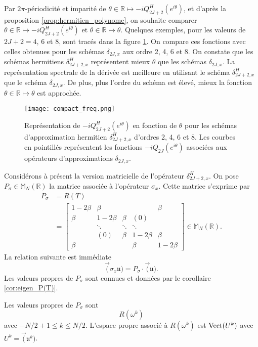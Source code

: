 Par $2 \pi$-périodicité et imparité de $\theta \in \mathbb{R} \mapsto - i Q_{2J+2}^H(e^{i \theta})$, et d'après la proposition \ref{prop:hermitien_polynome}, on souhaite comparer $\theta \in \mathbb{R} \mapsto - i Q_{2J+2}^H(e^{i \theta})$ et $\theta \in \mathbb{R} \mapsto \theta$. Quelques exemples, pour les valeurs de $2J+2 = 4$, $6$ et $8$, sont tracés dans la figure \ref{fig:freq_herm}. On compare ces fonctions avec celles obtenues pour les schémas $\delta_{2J,x}$ aux ordre 2, 4, 6 et 8. On constate que les schémas hermitiens $\delta_{2J+2,x}^H$ représentent mieux $\theta$ que les schémas $\delta_{2J,x}$. La représentation spectrale de la dérivée est meilleure en utilisant le schéma $\delta_{2J+2,x}^H$ que le schéma $\delta_{2J,x}$. De plus, plus l'ordre du schéma est élevé, mieux la fonction $\theta \in \mathbb{R} \mapsto \theta$ est approchée.

\begin{figure}[htbp]
\begin{center}
\texttt{[image: compact\_freq.png]}
\end{center}
\caption{Représentation de $-i Q_{2J+2}^H \left( e^{i \theta} \right)$ en fonction de $\theta$ pour les schémas d'approximation hermitien $\delta_{2J+2,x}^H$ d'ordres 2, 4, 6 et 8. Les courbes en pointillés représentent les fonctions $-i Q_{2J}\left( e^{i \theta} \right)$ associées aux opérateurs d'approximations $\delta_{2J,x}$.}
\label{fig:freq_herm}
\end{figure}


Considérons à présent la version matricielle de l'opérateur $\delta_{2J+2,x}^H$. On pose $P_{\sigma} \in \mathbb{M}_N(\mathbb{R})$ la matrice associée à l'opérateur $\sigma_x$. Cette matrice s'exprime par
\begin{align}
P_{\sigma} & = R(T) \\
  & = \begin{bmatrix}
  1 - 2 \beta & \beta &   &   & \beta \\ 
  \beta & 1 - 2 \beta & \beta & (0) &   \\ 
    & \ddots & \ddots & \ddots &   \\ 
    & (0) & \beta & 1 - 2 \beta & \beta \\ 
  \beta &   &   & \beta & 1 - 2 \beta
  \end{bmatrix} \in \mathbb{M}_{N}(\mathbb{R}).
\label{eq:matrice_implicitpart}
\end{align}
La relation suivante est immédiate
\begin{equation}
\vec (\sigma_x \mathfrak{u}) = P_{\sigma} \cdot \vec (\mathfrak{u}).
\end{equation}
Les valeurs propres de $P_{\sigma}$ sont connues et données par le corollaire \ref{cor:eigen_P(T)}.
\begin{proposition}
Les valeurs propres de $P_{\sigma}$ sont 
\begin{equation}
R(\omega^k)
\end{equation}
avec $-N/2+1 \leq k \leq N/2$. L'espace propre associé à $R(\omega^k)$ est $\text{Vect}(U^k)$ avec $U^k = \vec( \mathfrak{u}^k )$.
\end{proposition}

